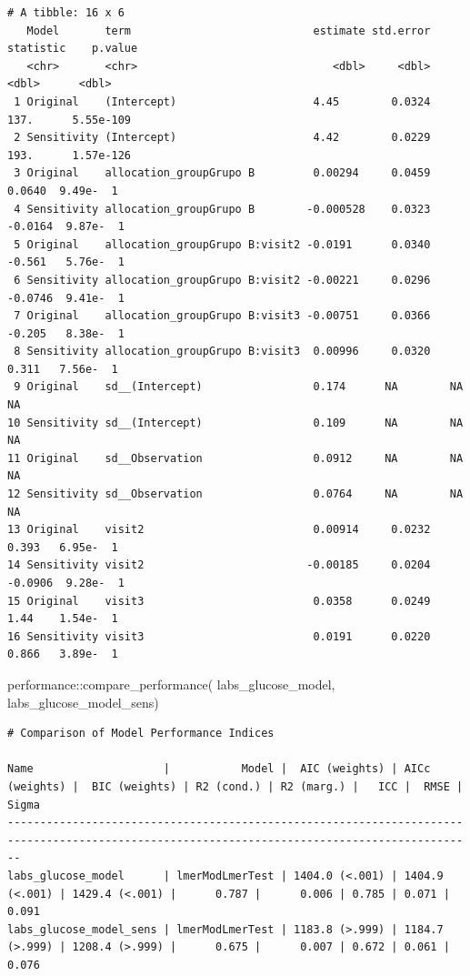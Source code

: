 \documentclass[
  12pt,
]{article}
\newenvironment{Shaded}{\begin{snugshade}}{\end{snugshade}}
\newcommand{\FunctionTok}[1]{\textcolor[rgb]{0.28,0.35,0.67}{#1}}
\newcommand{\NormalTok}[1]{\textcolor[rgb]{0.00,0.23,0.31}{#1}}
\newcommand{\SpecialCharTok}[1]{\textcolor[rgb]{0.37,0.37,0.37}{#1}}
\begin{document}
\begin{verbatim}
# A tibble: 16 x 6
   Model       term                            estimate std.error statistic    p.value
   <chr>       <chr>                              <dbl>     <dbl>     <dbl>      <dbl>
 1 Original    (Intercept)                     4.45        0.0324  137.      5.55e-109
 2 Sensitivity (Intercept)                     4.42        0.0229  193.      1.57e-126
 3 Original    allocation_groupGrupo B         0.00294     0.0459    0.0640  9.49e-  1
 4 Sensitivity allocation_groupGrupo B        -0.000528    0.0323   -0.0164  9.87e-  1
 5 Original    allocation_groupGrupo B:visit2 -0.0191      0.0340   -0.561   5.76e-  1
 6 Sensitivity allocation_groupGrupo B:visit2 -0.00221     0.0296   -0.0746  9.41e-  1
 7 Original    allocation_groupGrupo B:visit3 -0.00751     0.0366   -0.205   8.38e-  1
 8 Sensitivity allocation_groupGrupo B:visit3  0.00996     0.0320    0.311   7.56e-  1
 9 Original    sd__(Intercept)                 0.174      NA        NA      NA        
10 Sensitivity sd__(Intercept)                 0.109      NA        NA      NA        
11 Original    sd__Observation                 0.0912     NA        NA      NA        
12 Sensitivity sd__Observation                 0.0764     NA        NA      NA        
13 Original    visit2                          0.00914     0.0232    0.393   6.95e-  1
14 Sensitivity visit2                         -0.00185     0.0204   -0.0906  9.28e-  1
15 Original    visit3                          0.0358      0.0249    1.44    1.54e-  1
16 Sensitivity visit3                          0.0191      0.0220    0.866   3.89e-  1
\end{verbatim}

\begin{Shaded}
\begin{Highlighting}[]
\NormalTok{performance}\SpecialCharTok{::}\FunctionTok{compare\_performance}\NormalTok{(}
\NormalTok{    labs\_glucose\_model, }
\NormalTok{    labs\_glucose\_model\_sens) }
\end{Highlighting}
\end{Shaded}

\begin{verbatim}
# Comparison of Model Performance Indices

Name                    |           Model |  AIC (weights) | AICc (weights) |  BIC (weights) | R2 (cond.) | R2 (marg.) |   ICC |  RMSE | Sigma
----------------------------------------------------------------------------------------------------------------------------------------------
labs_glucose_model      | lmerModLmerTest | 1404.0 (<.001) | 1404.9 (<.001) | 1429.4 (<.001) |      0.787 |      0.006 | 0.785 | 0.071 | 0.091
labs_glucose_model_sens | lmerModLmerTest | 1183.8 (>.999) | 1184.7 (>.999) | 1208.4 (>.999) |      0.675 |      0.007 | 0.672 | 0.061 | 0.076
\end{verbatim}
\end{document}
